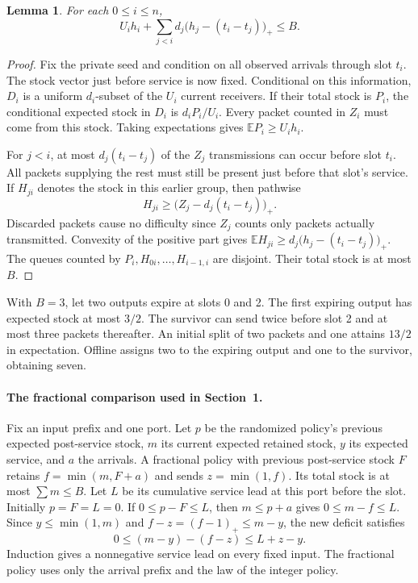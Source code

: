 \documentclass[11pt,letterpaper]{article}
\newtheorem{lemma}{Lemma}
\newcommand{\pos}[1]{\bigl(#1\bigr)_{+}}
\newcommand{\E}{\mathbb{E}}
\begin{document}
\begin{lemma}\label{lem:cap}
For each $0\le i\le n$,
\begin{equation}
 U_i h_i+\sum_{j<i} d_j\pos{h_j-(t_i-t_j)}\le B.\label{eq:cap}
\end{equation}
\end{lemma}
\begin{proof}
Fix the private seed and condition on all observed arrivals through slot $t_i$. The stock vector just before service is now fixed. Conditional on this information, $D_i$ is a uniform $d_i$-subset of the $U_i$ current receivers. If their total stock is $P_i$, the conditional expected stock in $D_i$ is $d_i P_i/U_i$. Every packet counted in $Z_i$ must come from this stock. Taking expectations gives $\E P_i\ge U_i h_i$.

For $j<i$, at most $d_j(t_i-t_j)$ of the $Z_j$ transmissions can occur before slot $t_i$. All packets supplying the rest must still be present just before that slot's service. If $H_{ji}$ denotes the stock in this earlier group, then pathwise
\[
 H_{ji}\ge \pos{Z_j-d_j(t_i-t_j)}.
\]
Discarded packets cause no difficulty since $Z_j$ counts only packets actually transmitted. Convexity of the positive part gives $\E H_{ji}\ge d_j\pos{h_j-(t_i-t_j)}$. The queues counted by $P_i,H_{0i},\ldots,H_{i-1,i}$ are disjoint. Their total stock is at most $B$.
\end{proof}

With $B=3$, let two outputs expire at slots 0 and 2. The first expiring output has expected stock at most $3/2$. The survivor can send twice before slot 2 and at most three packets thereafter. An initial split of two packets and one attains $13/2$ in expectation. Offline assigns two to the expiring output and one to the survivor, obtaining seven.

\paragraph{The fractional comparison used in Section~1.}
Fix an input prefix and one port. Let $p$ be the randomized policy's previous expected post-service stock, $m$ its current expected retained stock, $y$ its expected service, and $a$ the arrivals. A fractional policy with previous post-service stock $F$ retains $f=\min(m,F+a)$ and sends $z=\min(1,f)$. Its total stock is at most $\sum m\le B$. Let $L$ be its cumulative service lead at this port before the slot. Initially $p=F=L=0$. If $0\le p-F\le L$, then $m\le p+a$ gives $0\le m-f\le L$. Since $y\le\min(1,m)$ and $f-z=(f-1)_+\le m-y$, the new deficit satisfies
\[
  0\le (m-y)-(f-z)\le L+z-y .
\]
Induction gives a nonnegative service lead on every fixed input. The fractional policy uses only the arrival prefix and the law of the integer policy.
\end{document}
